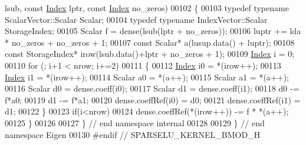 \begin{DoxyCode}
      lsub, \textcolor{keyword}{const} \hyperlink{namespace_eigen_a62e77e0933482dafde8fe197d9a2cfde}{Index} lptr, \textcolor{keyword}{const} \hyperlink{namespace_eigen_a62e77e0933482dafde8fe197d9a2cfde}{Index} no\_zeros)
00102 \{
00103   \textcolor{keyword}{typedef} \textcolor{keyword}{typename} ScalarVector::Scalar Scalar;
00104   \textcolor{keyword}{typedef} \textcolor{keyword}{typename} IndexVector::Scalar StorageIndex;
00105   Scalar f = dense(lsub(lptr + no\_zeros));
00106   luptr += lda * no\_zeros + no\_zeros + 1;
00107   \textcolor{keyword}{const} Scalar* a(lusup.data() + luptr);
00108   \textcolor{keyword}{const} StorageIndex*  irow(lsub.data()+lptr + no\_zeros + 1);
00109   \hyperlink{namespace_eigen_a62e77e0933482dafde8fe197d9a2cfde}{Index} i = 0;
00110   \textcolor{keywordflow}{for} (; i+1 < nrow; i+=2)
00111   \{
00112     \hyperlink{namespace_eigen_a62e77e0933482dafde8fe197d9a2cfde}{Index} i0 = *(irow++);
00113     \hyperlink{namespace_eigen_a62e77e0933482dafde8fe197d9a2cfde}{Index} i1 = *(irow++);
00114     Scalar a0 = *(a++);
00115     Scalar a1 = *(a++);
00116     Scalar d0 = dense.coeff(i0);
00117     Scalar d1 = dense.coeff(i1);
00118     d0 -= f*a0;
00119     d1 -= f*a1;
00120     dense.coeffRef(i0) = d0;
00121     dense.coeffRef(i1) = d1;
00122   \}
00123   \textcolor{keywordflow}{if}(i<nrow)
00124     dense.coeffRef(*(irow++)) -= f * *(a++);
00125 \}
00126 
00127 \} \textcolor{comment}{// end namespace internal}
00128 
00129 \} \textcolor{comment}{// end namespace Eigen}
00130 \textcolor{preprocessor}{#endif // SPARSELU\_KERNEL\_BMOD\_H}
\end{DoxyCode}
